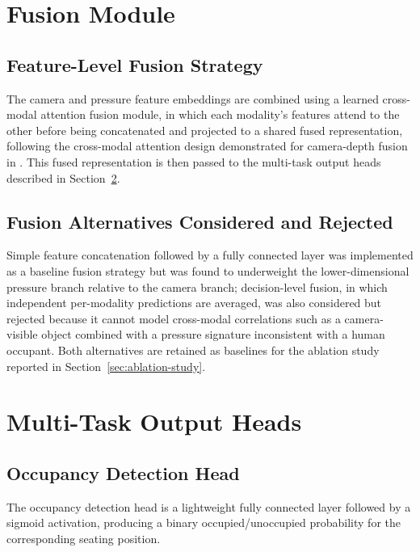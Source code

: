\section{Fusion Module}
\label{sec:fusion-module}

\subsection{Feature-Level Fusion Strategy}
\label{sec:feature-level-fusion-strategy}
The camera and pressure feature embeddings are combined using a learned
cross-modal attention fusion module, in which each modality's features
attend to the other before being concatenated and projected to a shared
fused representation, following the cross-modal attention design
demonstrated for camera-depth fusion in \cite{oliveira2022crossmodal}.
This fused representation is then passed to the multi-task output heads
described in Section~\ref{sec:multi-task-output-heads}.

\subsection{Fusion Alternatives Considered and Rejected}
\label{sec:fusion-alternatives-rejected}
Simple feature concatenation followed by a fully connected layer was
implemented as a baseline fusion strategy but was found to underweight
the lower-dimensional pressure branch relative to the camera branch;
decision-level fusion, in which independent per-modality predictions are
averaged, was also considered but rejected because it cannot model
cross-modal correlations such as a camera-visible object combined with a
pressure signature inconsistent with a human occupant. Both alternatives
are retained as baselines for the ablation study reported in
Section~\ref{sec:ablation-study}.

\section{Multi-Task Output Heads}
\label{sec:multi-task-output-heads}

\subsection{Occupancy Detection Head}
\label{sec:occupancy-head}
The occupancy detection head is a lightweight fully connected layer
followed by a sigmoid activation, producing a binary occupied/unoccupied
probability for the corresponding seating position.


